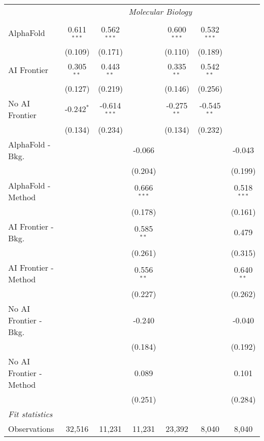 \begin{tabular}{lcccccc}
 & \multicolumn{6}{c}{\textit{Molecular Biology}} \\ \\
   AlphaFold               & 0.611$^{***}$ & 0.562$^{***}$  &               & 0.600$^{***}$ & 0.532$^{***}$ &   \\   
                           & (0.109)       & (0.171)        &               & (0.110)       & (0.189)       &   \\   
   AI Frontier             & 0.305$^{**}$  & 0.443$^{**}$   &               & 0.335$^{**}$  & 0.542$^{**}$  &   \\   
                           & (0.127)       & (0.219)        &               & (0.146)       & (0.256)       &   \\   
   No AI Frontier          & -0.242$^{*}$  & -0.614$^{***}$ &               & -0.275$^{**}$ & -0.545$^{**}$ &   \\   
                           & (0.134)       & (0.234)        &               & (0.134)       & (0.232)       &   \\   
   AlphaFold - Bkg.        &               &                & -0.066        &               &               & -0.043\\   
                           &               &                & (0.204)       &               &               & (0.199)\\   
   AlphaFold - Method      &               &                & 0.666$^{***}$ &               &               & 0.518$^{***}$\\   
                           &               &                & (0.178)       &               &               & (0.161)\\   
   AI Frontier - Bkg.      &               &                & 0.585$^{**}$  &               &               & 0.479\\   
                           &               &                & (0.261)       &               &               & (0.315)\\   
   AI Frontier - Method    &               &                & 0.556$^{**}$  &               &               & 0.640$^{**}$\\   
                           &               &                & (0.227)       &               &               & (0.262)\\   
   No AI Frontier - Bkg.   &               &                & -0.240        &               &               & -0.040\\   
                           &               &                & (0.184)       &               &               & (0.192)\\   
   No AI Frontier - Method &               &                & 0.089         &               &               & 0.101\\   
                           &               &                & (0.251)       &               &               & (0.284)\\   
   \midrule
   \emph{Fit statistics}\\
   Observations            & 32,516        & 11,231         & 11,231        & 23,392        & 8,040         & 8,040\\  
   

\end{tabular}
